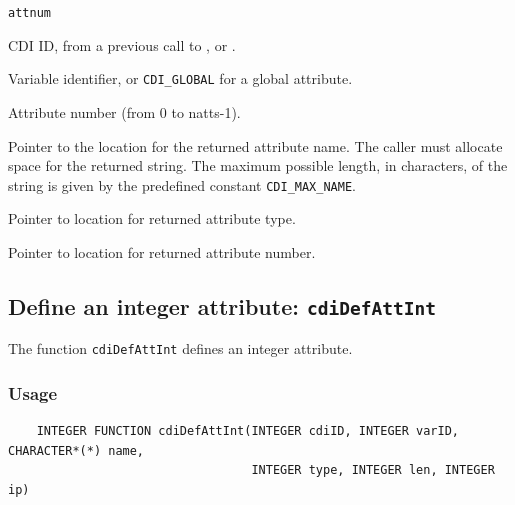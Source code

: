 \hspace*{4mm}\begin{minipage}[]{15cm}
\begin{deflist}{\texttt{attnum}\ }
\item[\texttt{cdiID}]
CDI ID, from a previous call to {}, {} or {}.
\item[\texttt{varID}]
Variable identifier, or {\texttt{CDI\_GLOBAL}} for a global attribute.
\item[\texttt{attnum}]
Attribute number (from 0 to natts-1).
\item[\texttt{name}]
Pointer to the location for the returned attribute name. The caller must allocate space for the
                    returned string. The maximum possible length, in characters, of
                    the string is given by the predefined constant {\texttt{CDI\_MAX\_NAME}}.
\item[\texttt{typep}]
Pointer to location for returned attribute type.
\item[\texttt{lenp}]
Pointer to location for returned attribute number.

\end{deflist}
\end{minipage}


\subsection{Define an integer attribute: \texttt{cdiDefAttInt}}
\label{cdiDefAttInt}

The function {\texttt{cdiDefAttInt}} defines an integer attribute.

\subsubsection*{Usage}

\begin{verbatim}
    INTEGER FUNCTION cdiDefAttInt(INTEGER cdiID, INTEGER varID, CHARACTER*(*) name, 
                                  INTEGER type, INTEGER len, INTEGER ip)
\end{verbatim}

